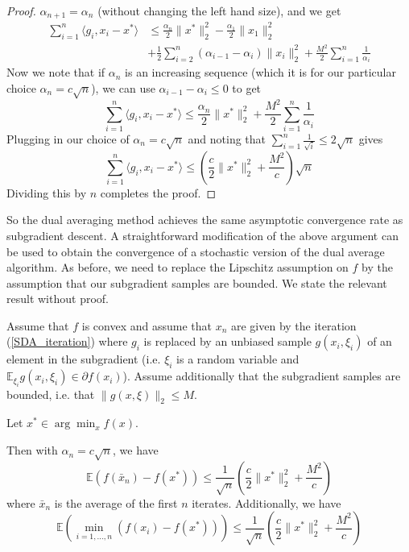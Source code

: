 \begin{proof}
 $\alpha_{n+1} = \alpha_n$ (without changing the left hand size), and we get
 \begin{align}
  \displaystyle\sum_{i = 1}^n \langle g_i, x_i - x^*\rangle &\leq \frac{\alpha_{n}}{2}\|x^*\|_2^2 - \frac{\alpha_1}{2}\|x_1\|_2^2 \\
  &+ \frac{1}{2}\displaystyle\sum_{i = 2}^{n}(\alpha_{i - 1} - \alpha_{i}) \|x_i\|_2^2 + \frac{M^2}{2}\displaystyle\sum_{i = 1}^n\frac{1}{\alpha_{i}} 
 \end{align}
 Now we note that if $\alpha_n$ is an increasing sequence (which it is for our particular choice $\alpha_n = c\sqrt{n}$), we can use 
 $\alpha_{i-1} - \alpha_i \leq 0$ to get
 \begin{equation}
  \displaystyle\sum_{i = 1}^n \langle g_i, x_i - x^*\rangle \leq\frac{\alpha_{n}}{2}\|x^*\|_2^2 + \frac{M^2}{2}\displaystyle\sum_{i = 1}^n\frac{1}{\alpha_{i}} 
 \end{equation}
 Plugging in our choice of $\alpha_n = c\sqrt{n}$ and noting that $\sum_{i = 1}^n \frac{1}{\sqrt{i}} \leq 2\sqrt{n}$ gives
 \begin{equation}
  \displaystyle\sum_{i = 1}^n \langle g_i, x_i - x^*\rangle \leq\left(\frac{c}{2}\|x^*\|_2^2 + \frac{M^2}{c}\right)\sqrt{n}
 \end{equation}
 Dividing this by $n$ completes the proof.

\end{proof}

So the dual averaging method achieves the same asymptotic convergence rate as subgradient descent. A straightforward modification
of the above argument can be used to obtain the convergence of a stochastic version of the dual average algorithm. As before,
we need to replace the Lipschitz assumption on $f$ by the assumption that our subgradient samples are bounded. We state the
relevant result without proof.

\begin{theorem}
 Assume that $f$ is convex and assume that $x_n$ are given by the iteration (\ref{SDA_iteration}) where $g_i$ is replaced by
 an unbiased sample $g(x_i,\xi_i)$ of an element in the subgradient 
 (i.e. $\xi_i$ is a random variable and $\mathbb{E}_{\xi_i}g(x_i,\xi_i) \in \partial f(x_i)$). Assume additionally that the 
 subgradient samples are bounded, i.e. that $\|g(x,\xi)\|_2 \leq M$.
 
 Let $x^*\in \arg\min_x f(x)$.
 
 Then with $\alpha_n = c\sqrt{n}$, we have
 \begin{equation}
  \mathbb{E}(f(\bar{x}_n) - f(x^*)) \leq \frac{1}{\sqrt{n}}\left(\frac{c}{2}\|x^*\|_2^2 + \frac{M^2}{c}\right)
 \end{equation}
 where $\bar{x}_n$ is the average of the first $n$ iterates. Additionally, we have
 \begin{equation}
  \mathbb{E}\left(\min_{i = 1,...,n} (f(x_i) - f(x^*))\right) \leq \frac{1}{\sqrt{n}}\left(\frac{c}{2}\|x^*\|_2^2 + \frac{M^2}{c}\right)
 \end{equation}
\end{theorem}

